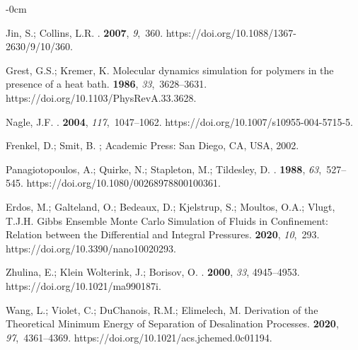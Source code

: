 \documentclass[gels,article,accept,pdftex,moreauthors]{Definitions/mdpi}
\begin{document}
\begin{adjustwidth}{-\extralength}{0cm}
\begin{thebibliography}{999}
Jin, S.; Collins, L.R.
.
 {\bf 2007}, {\em 9},~360.
\newblock
  https://doi.org/10.1088/1367-2630/9/10/360.%

Grest, G.S.; Kremer, K.
\newblock Molecular dynamics simulation for polymers in the presence of a heat
  bath.
 {\bf 1986}, {\em 33},~3628--3631.
\newblock
  https://doi.org/10.1103/PhysRevA.33.3628.%

Nagle, J.F.
.
 {\bf 2004}, {\em
  117},~1047--1062.
\newblock
  https://doi.org/10.1007/s10955-004-5715-5.%

Frenkel, D.; Smit, B.
; Academic Press:  San  Diego, CA, USA,  2002.

Panagiotopoulos, A.; Quirke, N.; Stapleton, M.; Tildesley, D.
.
 {\bf 1988}, {\em 63},~527--545.
\newblock
  https://doi.org/10.1080/00268978800100361.%

Erdos, M.; Galteland, O.; Bedeaux, D.; Kjelstrup, S.; Moultos, O.A.; Vlugt,
  T.J.H.
\newblock Gibbs Ensemble Monte Carlo Simulation of Fluids in Confinement:
  Relation between the Differential and Integral Pressures.
 {\bf 2020}, {\em 10},~293.
\newblock
  https://doi.org/10.3390/nano10020293.%

Zhulina, E.; {Klein Wolterink}, J.; Borisov, O.
.
 {\bf 2000}, {\em
  33}, 4945--4953.
\newblock
  https://doi.org/10.1021/ma990187i.%

Wang, L.; Violet, C.; DuChanois, R.M.; Elimelech, M.
\newblock Derivation of the Theoretical Minimum Energy of Separation of
  Desalination Processes.
 {\bf 2020}, {\em 97},~4361--4369.
\newblock
  https://doi.org/10.1021/acs.jchemed.0c01194.%


\end{thebibliography}
\end{adjustwidth}
\end{document}
